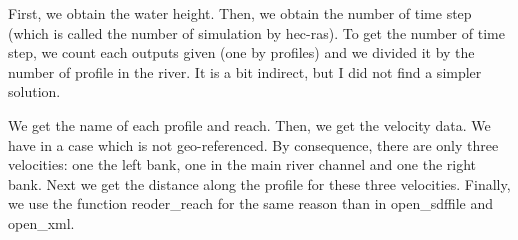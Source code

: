 \documentclass[letterpaper,10pt,english]{sphinxmanual}
\begin{document}
\begin{fulllineitems}
First, we obtain the water height. Then, we obtain the number of time step (which is called the number of
simulation by hec-ras). To get the number of time step, we count each outputs given (one by profiles) and we
divided it by the number of profile in the river. It is a bit indirect, but I did not find a simpler solution.

We get the name of each profile and reach. Then, we get the velocity data. We have in a case which is not
geo-referenced. By consequence, there are only three velocities: one the left bank, one in the main river channel
and one the right bank.  Next we get the distance along the profile for these three velocities. Finally, we use
the function reoder\_reach for the same reason than in open\_sdffile and open\_xml.

\end{fulllineitems}

\end{document}
